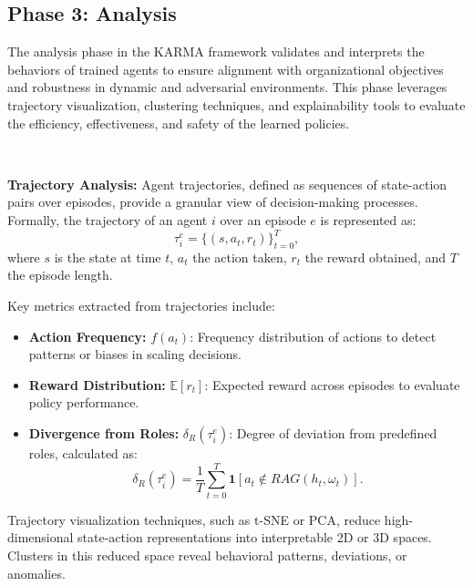 \documentclass[conference]{IEEEtran}
\begin{document}
\subsection{Phase 3: Analysis}

The analysis phase in the KARMA framework validates and interprets the behaviors of trained agents to ensure alignment with organizational objectives and robustness in dynamic and adversarial environments. This phase leverages trajectory visualization, clustering techniques, and explainability tools to evaluate the efficiency, effectiveness, and safety of the learned policies.

\

\noindent\textbf{Trajectory Analysis:} 
Agent trajectories, defined as sequences of state-action pairs over episodes, provide a granular view of decision-making processes. Formally, the trajectory of an agent $i$ over an episode $e$ is represented as:
\[
\tau_i^e = \{(s, a_t, r_t)\}_{t=0}^{T},
\]
where $s$ is the state at time $t$, $a_t$ the action taken, $r_t$ the reward obtained, and $T$ the episode length.

Key metrics extracted from trajectories include:
\begin{itemize}
    \item \textbf{Action Frequency:} $f(a_t)$: Frequency distribution of actions to detect patterns or biases in scaling decisions.
    \item \textbf{Reward Distribution:} $\mathbb{E}[r_t]$: Expected reward across episodes to evaluate policy performance.
    \item \textbf{Divergence from Roles:} $\delta_R(\tau_i^e)$: Degree of deviation from predefined roles, calculated as:
    \[
    \delta_R(\tau_i^e) = \frac{1}{T} \sum_{t=0}^T \mathbf{1}[a_t \notin RAG(h_t, \omega_t)].
    \]
\end{itemize}

Trajectory visualization techniques, such as t-SNE or PCA, reduce high-dimensional state-action representations into interpretable 2D or 3D spaces. Clusters in this reduced space reveal behavioral patterns, deviations, or anomalies.

\
\end{document}
